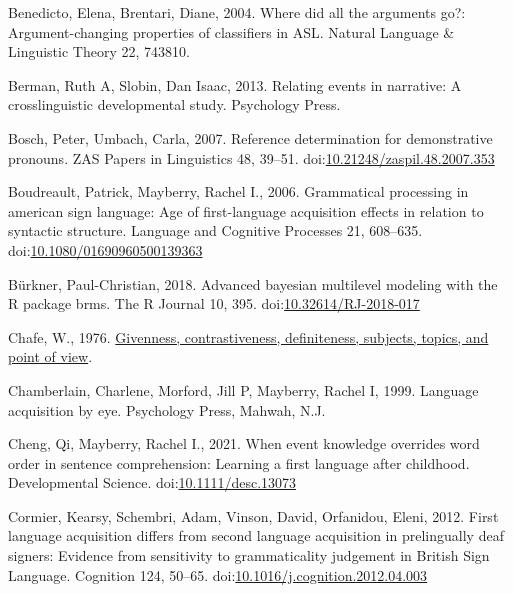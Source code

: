 \documentclass[]{elsarticle} %
\newlength{\cslhangindent}
\newenvironment{CSLReferences}[2] %
 {%
  \setlength{\parindent}{0pt}
  \ifodd #1 \everypar{\setlength{\hangindent}{\cslhangindent}}\ignorespaces\fi
  \ifnum #2 > 0
  \setlength{\parskip}{#2\baselineskip}
  \fi
 }%
 {}
\begin{document}
\begin{CSLReferences}{1}{0}
\leavevmode{}%
Benedicto, Elena, Brentari, Diane, 2004. Where did all the arguments
go?: Argument-changing properties of classifiers in ASL. Natural
Language \& Linguistic Theory 22, 743810.

\leavevmode{}%
Berman, Ruth A, Slobin, Dan Isaac, 2013. Relating events in narrative: A
crosslinguistic developmental study. Psychology Press.

\leavevmode{}%
Bosch, Peter, Umbach, Carla, 2007. Reference determination for
demonstrative pronouns. ZAS Papers in Linguistics 48, 39--51.
doi:\href{https://doi.org/10.21248/zaspil.48.2007.353}{10.21248/zaspil.48.2007.353}

\leavevmode{}%
Boudreault, Patrick, Mayberry, Rachel I., 2006. Grammatical processing
in american sign language: Age of first-language acquisition effects in
relation to syntactic structure. Language and Cognitive Processes 21,
608--635.
doi:\href{https://doi.org/10.1080/01690960500139363}{10.1080/01690960500139363}

\leavevmode{}%
Bürkner, Paul-Christian, 2018. Advanced bayesian multilevel modeling
with the R package brms. The R Journal 10, 395.
doi:\href{https://doi.org/10.32614/RJ-2018-017}{10.32614/RJ-2018-017}

\leavevmode{}%
Chafe, W., 1976.
\href{https:///paper/Givenness\%2C-contrastiveness\%2C-definiteness\%2C-subjects\%2C-Chafe/805a12a9bee00562f6c2663722e9f7f3f5991848}{Givenness,
contrastiveness, definiteness, subjects, topics, and point of view}.

\leavevmode{}%
Chamberlain, Charlene, Morford, Jill P, Mayberry, Rachel I, 1999.
Language acquisition by eye. Psychology Press, Mahwah, N.J.

\leavevmode{}%
Cheng, Qi, Mayberry, Rachel I., 2021. When event knowledge overrides
word order in sentence comprehension: Learning a first language after
childhood. Developmental Science.
doi:\href{https://doi.org/10.1111/desc.13073}{10.1111/desc.13073}

\leavevmode{}%
Cormier, Kearsy, Schembri, Adam, Vinson, David, Orfanidou, Eleni, 2012.
First language acquisition differs from second language acquisition in
prelingually deaf signers: Evidence from sensitivity to grammaticality
judgement in British Sign Language. Cognition 124, 50--65.
doi:\href{https://doi.org/10.1016/j.cognition.2012.04.003}{10.1016/j.cognition.2012.04.003}


\end{CSLReferences}
\end{document}
